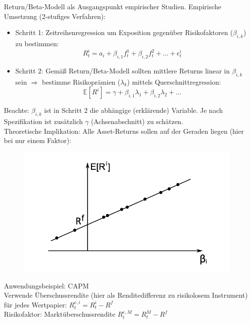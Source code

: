 \documentclass[12pt]{extreport} %
\theoremstyle{named}
\theoremstyle{nnamed}
\theoremstyle{itshape}
\theoremstyle{normal}
\begin{document}
Return/Beta-Modell als Ausgangspunkt empirischer Studien. Empirische Umsetzung (2-stufiges Verfahren):
\begin{itemize}
	\item Schritt 1: Zeitreihenregression um Exposition gegenüber Risikofaktoren ($\beta_{i,k}$) zu bestimmen:
		$$ R_t^i = a_i + \beta_{i,1} f_t^1 + \beta_{i,2} f_t^2 + \dotsc + \epsilon_t^i $$
	\item Schritt 2: Gemäß Return/Beta-Modell sollten mittlere Returns linear in $\beta_{i,k}$ sein $\Rightarrow$ bestimme Risikoprämien ($\lambda_{k}$) mittels Querschnittregression:
		$$ \mathbb{E}[R^i] = \gamma + \beta_{i,1} \lambda_1 + \beta_{i,2} \lambda_2 + \dotsc $$
\end{itemize}
Beachte: $\beta_{i,k}$ ist in Schritt 2 die abhängige (erklärende) Variable. Je nach Spezifikation ist zusätzlich $\gamma$ (Achsenabschnitt) zu schätzen. ~\\

Theoretische Implikation: Alle Asset-Returns sollen auf der Geraden liegen (hier bei nur einem Faktor):

\begin{figure}[h!] \centering
	\includegraphics[scale=0.75]{img/p90}
\end{figure}

Anwendungsbeispiel: CAPM ~\\
Verwende Überschussrendite (hier als Renditedifferenz zu risikolosem Instrument) für jedes Wertpapier: $R^{e,i}_t = R_{t}^i - R^f$ ~\\
	Risikofaktor: Marktüberschussrendite $R_t^{e,M} = R_{t}^M - R^f$
\end{document}

